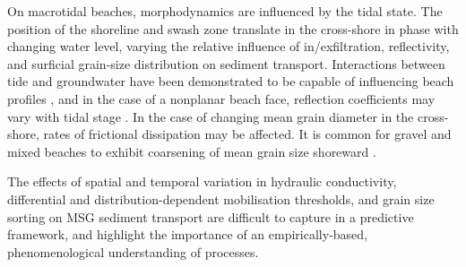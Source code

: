 On macrotidal beaches, morphodynamics are influenced by the tidal state. The position of the shoreline and swash zone translate in the cross-shore in phase with changing water level, varying the relative influence of in/exfiltration, reflectivity, and surficial grain-size distribution on sediment transport. Interactions between tide and groundwater have been demonstrated to be capable of influencing beach profiles \citep[e.g.,][]{Turner1995}, and in the case of a nonplanar beach face, reflection coefficients may vary with tidal stage \citep{Davidson_etal1994}. In the case of changing mean grain diameter in the cross-shore, rates of frictional dissipation may be affected. It is common for gravel and mixed beaches to exhibit coarsening of mean grain size shoreward \citep{Mason_Coates2001}. 

The effects of spatial and temporal variation in hydraulic conductivity, differential and distribution-dependent mobilisation thresholds, and grain size sorting on MSG sediment transport are difficult to capture in a predictive framework, and highlight the importance of an empirically-based, phenomenological understanding of processes. 





